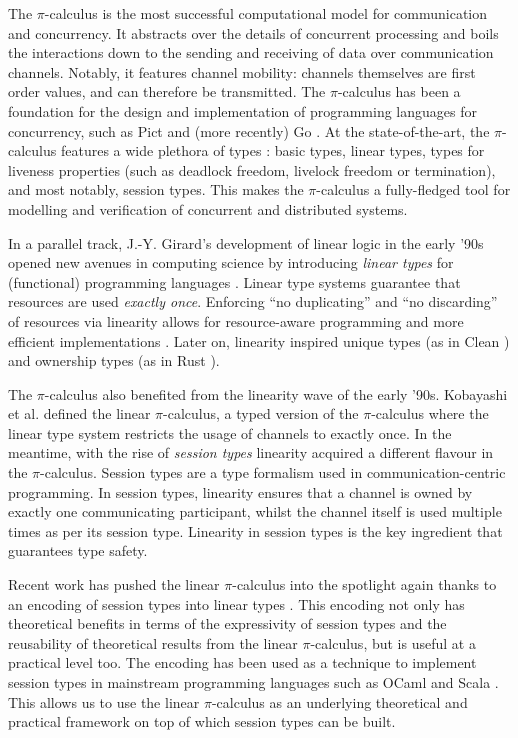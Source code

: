 \documentclass[a4paper,UKenglish,cleveref,autoref,thm-restate,authorcolumns]{lipics-v2019}
\theoremstyle{definition}
\newcommand{\picalc}{$\pi$-calculus}
\begin{document}
The \picalc{} \cite{MilnerPW92,Milner99} is the most successful computational model for communication and concurrency.
It abstracts over the details of concurrent processing and boils the interactions down to the sending and receiving of data over communication channels.
Notably, it features channel mobility: channels themselves are first order values, and can therefore be transmitted.
The \picalc{} has been a foundation for the design and implementation of programming languages for concurrency, such as Pict \cite{Pierce} and (more recently) Go \cite{Golang}.
At the state-of-the-art, the \picalc{} features a wide plethora of types \cite{K07}: basic types, linear types, types for liveness properties (such as deadlock freedom, livelock freedom or termination), and most notably, session types. This makes the \picalc{} a fully-fledged tool for modelling and verification of concurrent and distributed systems.

In a parallel track, J.-Y. Girard's development of linear logic \cite{Girard87} in the early '90s opened new avenues in computing science by introducing \emph{linear types} for (functional) programming languages \cite{Curry-Howard,Wadler90,Bernardy2018}.
Linear type systems guarantee that resources are used \emph{exactly once}.
Enforcing ``no duplicating'' and ``no discarding'' of resources via linearity allows for resource-aware programming and more efficient implementations \cite{Wadler90}.
Later on, linearity inspired unique types (as in Clean \cite{BarendsenS96}) and ownership types (as in Rust \cite{MatsakisK14}).

The \picalc{} also benefited from the linearity wave of the early '90s.
Kobayashi et al. \cite{KPT96} defined the {linear} \picalc{}, a typed version of the \picalc{} where the linear type system restricts the usage of channels to exactly once.
%
In the meantime, with the rise of \emph{session types} \cite{H93,THK94,HVK98} linearity acquired a different flavour in the \picalc{}.
Session types are a type formalism used in communication-centric programming.
In session types, linearity ensures that a channel is owned by exactly one communicating participant, whilst the channel itself is used multiple times as per its session type.
Linearity in session types is the key ingredient that guarantees type safety.

Recent work has pushed the linear \picalc{} into the spotlight again \cite{KPT96} thanks to an encoding of session types into linear types \cite{DardhaGS12,Dardha14,DardhaGS17}.
This encoding not only has theoretical benefits in terms of the expressivity of session types and the reusability of theoretical results from the linear \picalc{}, but is useful at a practical level too.
The encoding has been used as a technique to implement session types in mainstream programming languages such as OCaml \cite{Padovani17} and Scala \cite{ScalasY16,ScalasDHY17}.
This allows us to use the linear \picalc{} as an underlying theoretical and practical framework on top of which session types can be built.
\end{document}
